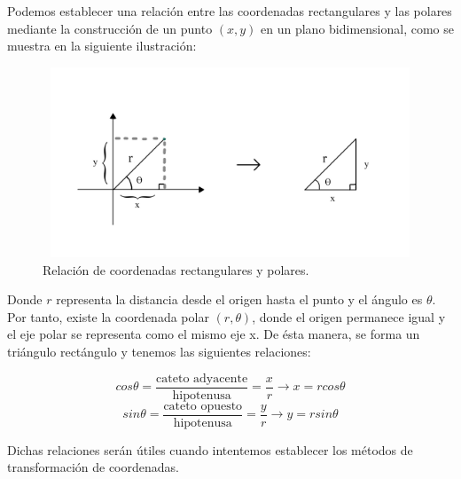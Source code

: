Podemos establecer una relación entre las coordenadas rectangulares y las polares mediante la construcción de un punto $(x,y)$ en un plano bidimensional, como se muestra en la siguiente ilustración:

\begin{figure}[H]
  \centering
  \includegraphics[width=11.17cm, height=5.67cm]{img/graph/relacion_r}
  \caption{Relación de coordenadas rectangulares y polares.}
  \label{relacion_de_coordenadas}
\end{figure}

Donde $r$ representa la distancia desde el origen hasta el punto y el ángulo es $\theta$. Por tanto, existe la coordenada polar $(r,\theta)$, donde el origen permanece igual y el eje polar se representa como el mismo eje x. De ésta manera, se forma un triángulo rectángulo y tenemos las siguientes relaciones:

\[cos\theta = \frac{\text{cateto adyacente}}{\text{hipotenusa}} = \frac{x}{r} \rightarrow x = rcos\theta\]
\[sin\theta = \frac{\text{cateto opuesto}}{\text{hipotenusa}} = \frac{y}{r} \rightarrow y = rsin\theta\]

\vspace{4mm}
Dichas relaciones serán útiles cuando intentemos establecer los métodos de transformación de coordenadas.
